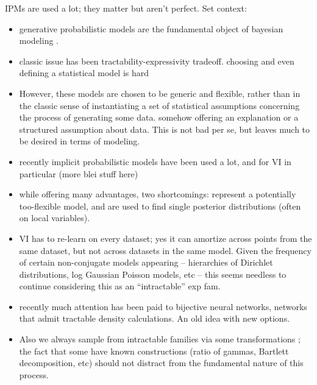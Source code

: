 \documentclass{article}
\begin{document}
IPMs are used a lot; they matter but aren't perfect.  Set context:
\begin{itemize}
\item generative probabilistic models are the fundamental object of bayesian modeling \cite{gelman2014bayesian}.  
\item classic issue has been tractability-expressivity tradeoff.  choosing and even defining a statistical model is hard \cite{mccullagh2002, gelman2014bayesian}
\item  However, these models are chosen to be generic and flexible, rather than in the classic sense of instantiating a set of statistical assumptions concerning the process of generating some data.  somehow offering an explanation or a structured assumption about data.  This is not bad per se, but leaves much to be desired in terms of modeling.
\item recently implicit probabilistic models have been used a lot, and for VI in particular \cite{Kingma:2013aa, rezende2014stochastic, titsias2014doubly}  (more blei stuff here)
\item while offering many advantages, two shortcomings: represent a potentially too-flexible model, and are used to find single posterior distributions (often on local variables).
\item VI has to re-learn on every dataset; yes it can amortize across points from the same dataset, but not across datasets in the same model.  Given the frequency of certain non-conjugate models appearing -- hierarchies of Dirichlet distributions, log Gaussian Poisson models, etc -- this seems needless to continue considering this as an ``intractable'' exp fam. 
\item recently much attention has been paid to bijective neural networks, networks that admit tractable density calculations.  An old idea with new options.  
\item Also we always sample from intractable families via some transformations \cite{Devroye:1986aa}; the fact that some have known constructions (ratio of gammas, Bartlett decomposition, etc) should not distract from the fundamental nature of this process. 
\end{itemize}
\end{document}
